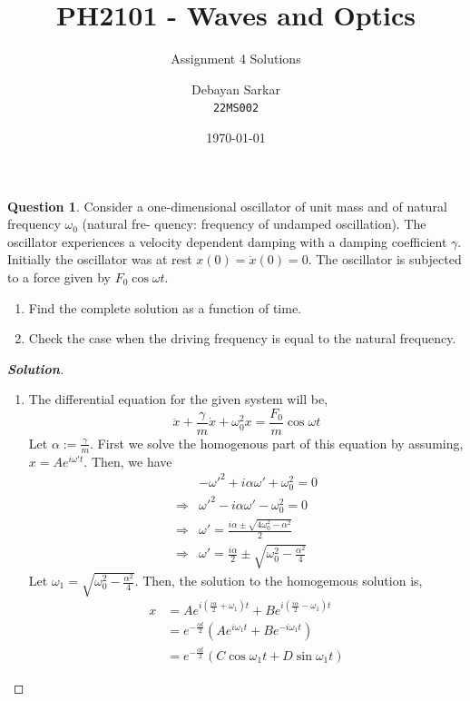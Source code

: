 \documentclass[10pt]{scrartcl}
\title{PH2101 - Waves and Optics}
\subtitle{Assignment 4 Solutions}
\author{Debayan Sarkar \\ \texttt{22MS002}}
\date{\today}
\theoremstyle{definition}
\newtheorem{exercise}{Question}
\newenvironment{solution} {\begin{proof}[\normalfont \textbf{Solution}]} {\end{proof}}
\begin{document}
\maketitle
\begin{exercise}
    Consider a one-dimensional oscillator of unit mass and of natural frequency $\omega_0$ (natural fre-
    quency: frequency of undamped oscillation). The oscillator experiences a velocity dependent
    damping with a damping coefficient $\gamma$.
    Initially the oscillator was at rest $x(0) = \dot{x}(0) = 0$. The oscillator is subjected to a force given
    by $F_0\cos \omega t$.
    \begin{enumerate}[label={(\alph*)}]
        \item Find the complete solution as a function of time.
        \item Check the case when the driving frequency is equal to the natural frequency.
    \end{enumerate}
    \begin{solution}
        $ $
        \begin{enumerate}[label={(\alph*)}]
            \item The differential equation for the given system will be, 
                $$\ddot{x} +\frac{\gamma}{m} \dot{x}+ \omega_0^2x = \frac{F_0}{m} \cos\omega t$$
                Let $\alpha := \frac{\gamma}{m}$.
                First we solve the homogenous part of this equation by assuming, $x = Ae^{i\omega't}$.
                Then, we have
                \begin{align*}
                    & -\omega'^2 + i\alpha \omega' + \omega_0^2 = 0 \\ 
                    \Rightarrow & \omega'^2 - i\alpha \omega' - \omega_0^2 = 0 \\ 
                    \Rightarrow & \omega' = \frac{i\alpha \pm \sqrt{4\omega_0^2 - \alpha^2}}{2}\\ 
                    \Rightarrow & \omega' = \frac{i\alpha}{2} \pm \sqrt{\omega_0^2 - \frac{\alpha^2}{4}}
                \end{align*}
                Let $\omega_1 = \sqrt{\omega_0^2 - \frac{\alpha^2}{4}}$. Then, the solution to the homogemous solution is, 
                \begin{align*}
                    x &= Ae^{i({\frac{i\alpha}{2} + \omega_1})t}+ Be^{i({\frac{i\alpha}{2} - \omega_1})t} \\ 
                      &= e^{-\frac{\alpha t}{2}}(Ae^{i\omega_1t} + Be^{-i\omega_1t}) \\ 
                      &= e^{-\frac{\alpha t}{2}}(C\cos\omega_1t + D\sin\omega_1t)
                \end{align*}


\end{enumerate}
\end{solution}
\end{exercise}
\end{document}
